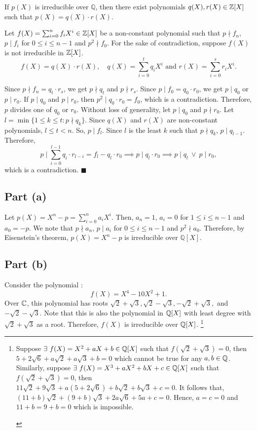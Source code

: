 \begin{thisnote1}

If $p(X)$ is irreducible over $\mathbb{Q}$, then there exist polynomials $q(X),r(X)\in \mathbb{Z}[X]$ such that $p(X) = q(X)\cdot r(X)$.

\end{thisnote1}
Let $f(X) = \sum_{i=0}^n f_i X^{i}\in \mathbb{Z}[X]$ be a non-constant polynomial such that $p \nmid f_n$, $p\mid f_i$ for $0\leq i\leq n-1$ and $p^2 \nmid f_0$.
For the sake of contradiction, suppose $f(X)$ is not irreducible in $\mathbb{Z}[X]$.
\[f(X) = q(X)\cdot r(X),\quad  q(X) = \sum_{i=0}^t q_i X^i  \text{ and } r(X) = \sum_{i=0}^s r_i X^i.\]

Since $p\nmid f_n = q_t\cdot r_s$, we get $p\nmid q_t$ and $p\nmid r_s$. Since $p\mid f_0 = q_0 \cdot r_0$, we get $p\mid q_0$ or $p\mid r_0$. If $p\mid q_0$ and $p\mid r_0$, then $p^2\mid q_0\cdot r_0 = f_0$, which is a contradiction. Therefore, $p$ divides one of $q_0$ or $r_0$. Without loss of generality, let $p\mid q_0$ and $p\nmid r_0$. Let $l=\min\{1\leq k\leq t : p\nmid q_k\}$. Since $q(X)$ and $r(X)$ are non-constant polynomials, $l\leq t<n$. So, $p\mid f_l$. Since $l$ is the least $k$ such that $p\nmid q_k$, $p\mid q_{l-1}$. Therefore,
    \[p \mid  \sum_{i=0}^{l-1} q_i \cdot r_{l-i} = f_l - q_l\cdot r_0 \implies p\mid q_l\cdot r_0 \implies p\mid q_l\ \lor\ p\mid r_0, \]
    which is a contradiction. \hfill $\blacksquare$

\subsection{Part (a)}

Let $p(X) = X^n - p = \sum_{i=0}^n a_i X^i$. Then, $a_n = 1$, $a_i = 0$ for $1\leq i\leq n-1$ and $a_0 = -p$. We note that $p\nmid a_n$, $p\mid a_i$ for $0\leq i\leq n-1$ and $p^2\nmid a_0$. Therefore, by Eisenstein's theorem, $p(X) = X^n - p$ is irreducible over $\mathbb{Q}[X]$.

\subsection{Part (b)}

Consider the polynomial : 
\[f(X) = X^4 - 10X^2 + 1.\]
Over $\mathbb{C}$, this polynomial has roots $\sqrt{2}+\sqrt{3},\sqrt{2}-\sqrt{3},-\sqrt{2}+\sqrt{3},$ and $-\sqrt{2}-\sqrt{3}$. Note that this is also the polynomial in $\mathbb{Q}[X]$ with least degree with $\sqrt{2}+\sqrt{3}$ as a root. Therefore, $f(X)$ is irreducible over $\mathbb{Q}[X]$.
\footnote{\begin{thisnote}
    Suppose $\exists\ f(X) = X^2+aX+b \in \mathbb{Q}[X]$ such that $f(\sqrt{2}+\sqrt{3}) = 0$, then $5+2\sqrt{6}+a\sqrt{2}+a\sqrt{3}+b = 0$ which cannot be true for any $a,b\in \mathbb{Q}$. Similarly, suppose $\exists\ f(X) = X^3+aX^2+bX+c\in \mathbb{Q}[X]$ such that $f(\sqrt{2}+\sqrt{3})=0$, then $11\sqrt{2}+9\sqrt{3}+a(5+2\sqrt{6})+b\sqrt{2}+b\sqrt{3}+c = 0$. It follows that, $(11+b)\sqrt{2}+(9+b)\sqrt{3}+2a\sqrt{6}+5a+c = 0$. Hence, $a=c=0$ and $11+b=9+b=0$ which is impossible.
\end{thisnote}}

